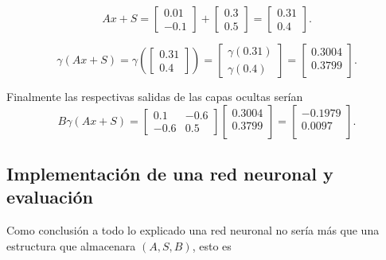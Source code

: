 \begin{equation}
    A x +S= 
    \begin{bmatrix}
        0.01  \\
        -0.1 
    \end{bmatrix}
    + 
    \begin{bmatrix}
        0.3  \\
        0.5 
    \end{bmatrix}
    = 
    \begin{bmatrix}
        0.31  \\
        0.4 
    \end{bmatrix}
    . 
\end{equation}

\begin{equation}
    \gamma (A x +S) = 
    \gamma \left(
    \begin{bmatrix}
        0.31  \\
        0.4 
    \end{bmatrix}
    \right)
    = 
    \begin{bmatrix}
        \gamma(0.31)  \\
        \gamma(0.4) 
    \end{bmatrix}
    = 
    \begin{bmatrix}
        0.3004 \\
        0.3799  \\
    \end{bmatrix}.
\end{equation}

Finalmente las respectivas salidas de las capas ocultas serían
\begin{equation}
    B  \gamma (A x +S)  
    = 
    \begin{bmatrix}
        0.1 & -0.6 \\
        -0.6 & 0.5
    \end{bmatrix}
    \begin{bmatrix}
        0.3004 \\
        0.3799  \\
    \end{bmatrix}
    = 
    \begin{bmatrix}
        -0.1979 \\
       0.0097  \\
    \end{bmatrix}.
\end{equation}

\subsection{Implementación de una red neuronal y evaluación}
\label{section:rrnn_implementation}
Como conclusión a todo lo explicado una red neuronal no 
sería más que una estructura que almacenara $(A, S, B)$, esto es 

